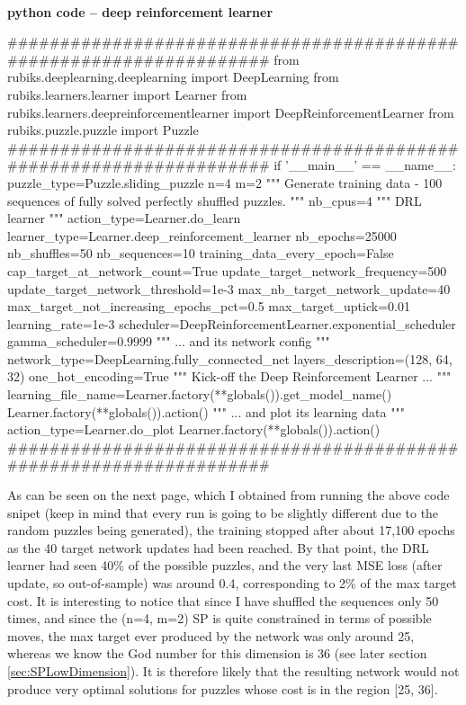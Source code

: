 \paragraph{}{\textbf{python code -- deep reinforcement learner}}
\begin{python}
####################################################################
from rubiks.deeplearning.deeplearning import DeepLearning
from rubiks.learners.learner import Learner
from rubiks.learners.deepreinforcementlearner import DeepReinforcementLearner
from rubiks.puzzle.puzzle import Puzzle
####################################################################
if '__main__' == __name__:
    puzzle_type=Puzzle.sliding_puzzle
    n=4
    m=2
    """ Generate training data - 100 sequences of fully 
    solved perfectly shuffled puzzles. 
    """
    nb_cpus=4
    """ DRL learner """
    action_type=Learner.do_learn
    learner_type=Learner.deep_reinforcement_learner
    nb_epochs=25000
    nb_shuffles=50
    nb_sequences=10
    training_data_every_epoch=False
    cap_target_at_network_count=True
    update_target_network_frequency=500
    update_target_network_threshold=1e-3
    max_nb_target_network_update=40
    max_target_not_increasing_epochs_pct=0.5
    max_target_uptick=0.01
    learning_rate=1e-3
    scheduler=DeepReinforcementLearner.exponential_scheduler
    gamma_scheduler=0.9999
    """ ... and its network config """
    network_type=DeepLearning.fully_connected_net
    layers_description=(128, 64, 32)
    one_hot_encoding=True
    """ Kick-off the Deep Reinforcement Learner ... """
    learning_file_name=Learner.factory(**globals()).get_model_name()
    Learner.factory(**globals()).action()
    """ ... and plot its learning data """
    action_type=Learner.do_plot
    Learner.factory(**globals()).action()
####################################################################
\end{python}
\black
As can be seen on the next page, which I obtained from running the above code snipet (keep in mind that every run is going to be slightly different due to the random puzzles being generated), the training stopped after about 17,100 epochs as the 40 target network updates had been reached. By that point, the DRL learner had seen 40\% of the possible puzzles, and the very last MSE loss (after update, so out-of-sample) was around 0.4, corresponding to 2\% of the max target cost. It is interesting to notice that since I have shuffled the sequences only 50 times, and since the (n=4, m=2) SP is quite constrained in terms of possible moves, the max target ever produced by the network was only around 25, whereas we know the God number for this dimension is 36 (see later section \ref{sec:SPLowDimension}). It is therefore likely that the resulting network would not produce very optimal solutions for puzzles whose cost is in the region [25, 36]. 


